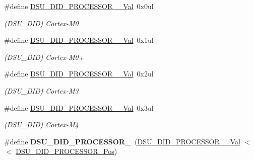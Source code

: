 \begin{DoxyCompactItemize}
\item 
\hypertarget{group___s_a_m_l21___d_s_u_gaf459a9041b7290a8779e95ae31a0ac91}{}\#define \hyperlink{group___s_a_m_l21___d_s_u_gaf459a9041b7290a8779e95ae31a0ac91}{D\+S\+U\+\_\+\+D\+I\+D\+\_\+\+P\+R\+O\+C\+E\+S\+S\+O\+R\+\_\+\_\+\+Val}~0x0ul\label{group___s_a_m_l21___d_s_u_gaf459a9041b7290a8779e95ae31a0ac91}

\begin{DoxyCompactList}\small\item\em (D\+S\+U\+\_\+\+D\+I\+D) Cortex-\/\+M0 \end{DoxyCompactList}\item 
\hypertarget{group___s_a_m_l21___d_s_u_gac2f32025209af56842bfe0f9fc892b56}{}\#define \hyperlink{group___s_a_m_l21___d_s_u_gac2f32025209af56842bfe0f9fc892b56}{D\+S\+U\+\_\+\+D\+I\+D\+\_\+\+P\+R\+O\+C\+E\+S\+S\+O\+R\+\_\+\_\+\+Val}~0x1ul\label{group___s_a_m_l21___d_s_u_gac2f32025209af56842bfe0f9fc892b56}

\begin{DoxyCompactList}\small\item\em (D\+S\+U\+\_\+\+D\+I\+D) Cortex-\/\+M0+ \end{DoxyCompactList}\item 
\hypertarget{group___s_a_m_l21___d_s_u_ga723c965c65022c1bf4315e59dfe3591c}{}\#define \hyperlink{group___s_a_m_l21___d_s_u_ga723c965c65022c1bf4315e59dfe3591c}{D\+S\+U\+\_\+\+D\+I\+D\+\_\+\+P\+R\+O\+C\+E\+S\+S\+O\+R\+\_\+\_\+\+Val}~0x2ul\label{group___s_a_m_l21___d_s_u_ga723c965c65022c1bf4315e59dfe3591c}

\begin{DoxyCompactList}\small\item\em (D\+S\+U\+\_\+\+D\+I\+D) Cortex-\/\+M3 \end{DoxyCompactList}\item 
\hypertarget{group___s_a_m_l21___d_s_u_gaf13d713f6369fd6ddf23f9cc03e307c5}{}\#define \hyperlink{group___s_a_m_l21___d_s_u_gaf13d713f6369fd6ddf23f9cc03e307c5}{D\+S\+U\+\_\+\+D\+I\+D\+\_\+\+P\+R\+O\+C\+E\+S\+S\+O\+R\+\_\+\_\+\+Val}~0x3ul\label{group___s_a_m_l21___d_s_u_gaf13d713f6369fd6ddf23f9cc03e307c5}

\begin{DoxyCompactList}\small\item\em (D\+S\+U\+\_\+\+D\+I\+D) Cortex-\/\+M4 \end{DoxyCompactList}\item 
\hypertarget{group___s_a_m_l21___d_s_u_gadb76fb8bd329f769d6a412eaba90d344}{}\#define {\bfseries D\+S\+U\+\_\+\+D\+I\+D\+\_\+\+P\+R\+O\+C\+E\+S\+S\+O\+R\+\_}~(\hyperlink{group___s_a_m_l21___d_s_u_gaf459a9041b7290a8779e95ae31a0ac91}{D\+S\+U\+\_\+\+D\+I\+D\+\_\+\+P\+R\+O\+C\+E\+S\+S\+O\+R\+\_\+\_\+\+Val}       $<$$<$ \hyperlink{group___s_a_m_l21___d_s_u_gaf39e8c9b37c218a74228db9507493fa2}{D\+S\+U\+\_\+\+D\+I\+D\+\_\+\+P\+R\+O\+C\+E\+S\+S\+O\+R\+\_\+\+Pos})\label{group___s_a_m_l21___d_s_u_gadb76fb8bd329f769d6a412eaba90d344}


\end{DoxyCompactItemize}
